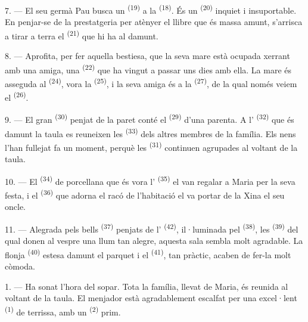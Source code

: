 \VUsaut{5.0mm}
\VUsaut{3.0mm}

7. --- El seu germà Pau busca un  \textsuperscript{(19)} a la
 \textsuperscript{(18)}. És un 
\textsuperscript{(20)} inquiet i insuportable. En penjar-se de la prestatgeria per atènyer el
llibre que és massa amunt, s'arrisca a tirar a terra el  \textsuperscript{(21)}
que hi ha al damunt.

8. --- Aprofita, per fer aquella bestiesa, que la seva mare està ocupada xerrant amb una
amiga, una  \textsuperscript{(22)} que ha vingut a passar uns dies amb ella.
La mare és asseguda al  \textsuperscript{(24)}, vora la 
\textsuperscript{(25)}, i la seva amiga és a la
 \textsuperscript{(27)}, de la qual només veiem el
 \textsuperscript{(26)}.

9. --- El gran  \textsuperscript{(30)} penjat de la paret conté el
 \textsuperscript{(29)} d'una parenta. A l'
\textsuperscript{(32)} que és damunt la taula es reuneixen les 
\textsuperscript{(33)} dels altres membres de la família. Els nens l'han fullejat fa un
moment, perquè les  \textsuperscript{(31)} continuen agrupades al voltant de
la taula.

10. --- El  \textsuperscript{(34)} de porcellana que és vora
l' \textsuperscript{(35)} el van regalar a Maria per la seva festa, i el
 \textsuperscript{(36)} que adorna el racó de l'habitació el va portar de la
Xina el seu oncle.

11. --- Alegrada pels bells  \textsuperscript{(37)} penjats de l'
\textsuperscript{(42)}, il·luminada pel  \textsuperscript{(38)}, les
 \textsuperscript{(39)} del qual donen al vespre una llum tan alegre, aquesta
sala sembla molt agradable. La flonja
 \textsuperscript{(40)} estesa damunt el parquet i el
 \textsuperscript{(41)}, tan pràctic, acaben de fer-la
molt còmoda.

\VUsaut{3.6mm}
\VUsaut{3.0mm}

1. --- Ha sonat l'hora del sopar. Tota la família, llevat de Maria, és reunida al voltant de
la taula. El menjador està agradablement escalfat per una excel·lent
 \textsuperscript{(1)} de terrissa, amb un 
\textsuperscript{(2)} prim.

